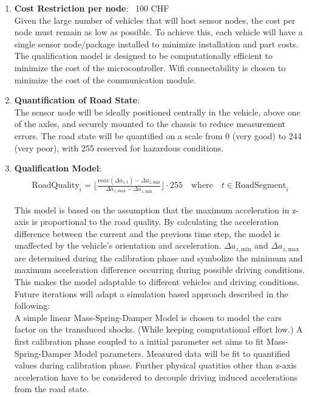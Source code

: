 \begin{enumerate}
    \item \textbf{Cost Restriction per node}: ~100 CHF  \\
      Given the large number of vehicles that will host sensor nodes, the cost per node must remain as low as possible. To achieve this, each vehicle will have a single sensor node/package installed to minimize installation and part costs.
      The qualification model is designed to be computationally efficient to minimize the cost of the microcontroller. Wifi connectability is chosen to minimize the cost of the communication module.

    \item \textbf{Quantification of Road State}: \\
      The sensor node will be ideally positioned centrally in the vehicle, above one of the axles, and securely mounted to the chassis to reduce measurement errors. The road state will be quantified on a scale from 0 (very good) to 244 (very poor), with 255 reserved for hazardous conditions.
    
   \item \textbf{Qualification Model}: \\
      \begin{align}
         \text{RoadQuality}_i =  \lfloor \frac{max(\Delta a_{z,t}) - \Delta a_{z,\text{min}}}{\Delta a_{z,\text{max}} - \Delta a_{z,\text{min}}} \rfloor  \cdot 255 \quad \text{where} \quad  t \in \text{RoadSegment}_i
      \end{align}

      This model is based on the assumption that the maximum acceleration in z-axis is proportional to the road quality.
      By calculating the acceleration difference between the current and the previous time step, the model is unaffected by the vehicle's orientation and acceleration.
      $\Delta a_{z,\text{min}}$ and $\Delta a_{z,\text{max}}$ are determined during the calibration phase and symbolize the minimum and maximum acceleration difference occurring during possible driving conditions. 
      This makes the model adaptable to different vehicles and driving conditions. \\

      Future iterations will adapt a simulation based approach described in the following: \\
      A simple linear Mass-Spring-Damper Model is chosen to model the cars factor on the transduced shocks. (While keeping computational effort low.)
      A first calibration phase coupled to a initial parameter set aims to fit Mass-Spring-Damper Model parameters.
      Measured data will be fit to quantified values during calibration phase.
      Further physical quatities other than z-axis acceleration have to be considered to decouple driving induced accelerations from the road state.
    

\end{enumerate}

